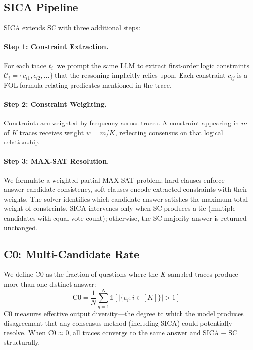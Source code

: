\documentclass[11pt,a4paper]{article}
\begin{document}
\subsection{SICA Pipeline}

SICA extends SC with three additional steps:

\paragraph{Step 1: Constraint Extraction.} For each trace $t_i$, we prompt the same LLM to extract first-order logic constraints $\mathcal{C}_i = \{c_{i1}, c_{i2}, \ldots\}$ that the reasoning implicitly relies upon. Each constraint $c_{ij}$ is a FOL formula relating predicates mentioned in the trace.

\paragraph{Step 2: Constraint Weighting.} Constraints are weighted by frequency across traces. A constraint appearing in $m$ of $K$ traces receives weight $w = m/K$, reflecting consensus on that logical relationship.

\paragraph{Step 3: MAX-SAT Resolution.} We formulate a weighted partial MAX-SAT problem: hard clauses enforce answer-candidate consistency, soft clauses encode extracted constraints with their weights. The solver identifies which candidate answer satisfies the maximum total weight of constraints. SICA intervenes only when SC produces a tie (multiple candidates with equal vote count); otherwise, the SC majority answer is returned unchanged.

\subsection{C0: Multi-Candidate Rate}

We define C0 as the fraction of questions where the $K$ sampled traces produce more than one distinct answer:
\begin{equation}
\text{C0} = \frac{1}{N} \sum_{q=1}^N \mathbb{1}\left[|\{a_i : i \in [K]\}| > 1\right]
\end{equation}
C0 measures effective output diversity---the degree to which the model produces disagreement that any consensus method (including SICA) could potentially resolve. When C0$\approx$0, all traces converge to the same answer and SICA$\equiv$SC structurally.
\end{document}
